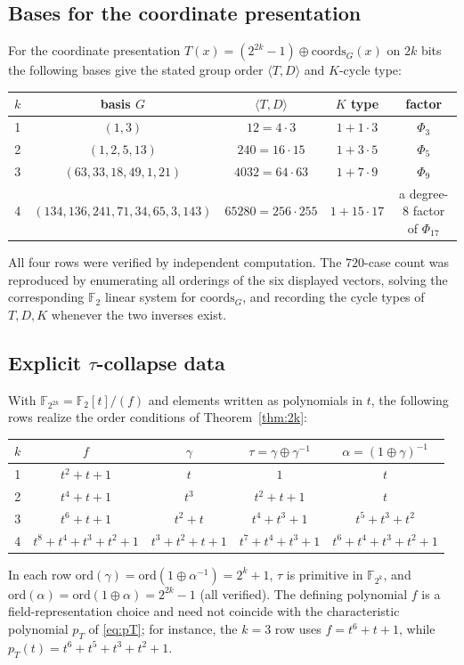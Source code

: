 \documentclass[11pt]{article}
\begin{document}
\subsection*{Bases for the coordinate presentation}
For the coordinate presentation $T(x)=(2^{2k}-1)\oplus\mathrm{coords}_G(x)$ on
$2k$ bits the following bases give the stated group order $\langle T,D\rangle$ and
$K$-cycle type:
\begin{center}
\begin{tabular}{c|c|c|c|c}
$k$ & basis $G$ & $\langle T,D\rangle$ & $K$ type & factor \\
\hline
1 & $(1,3)$ & $12=4\cdot3$ & $1+1\cdot3$ & $\Phi_3$ \\
2 & $(1,2,5,13)$ & $240=16\cdot15$ & $1+3\cdot5$ & $\Phi_5$ \\
3 & $(63,33,18,49,1,21)$ & $4032=64\cdot63$ & $1+7\cdot9$ & $\Phi_9$ \\
4 & $(134,136,241,71,34,65,3,143)$ & $65280=256\cdot255$ & $1+15\cdot17$ & a degree-$8$ factor of $\Phi_{17}$ \\
\end{tabular}
\end{center}
All four rows were verified by independent computation. The $720$-case count
was reproduced by enumerating all orderings of the six displayed vectors, solving
the corresponding $\mathbb{F}_2$ linear system for $\mathrm{coords}_G$, and
recording the cycle types of $T,D,K$ whenever the two inverses exist.

\subsection*{Explicit $\tau$-collapse data}
With $\mathbb{F}_{2^{2k}}=\mathbb{F}_2[t]/(f)$ and elements written as polynomials in $t$,
the following rows realize the order conditions of Theorem~\ref{thm:2k}:
\begin{center}
\begin{tabular}{c|c|c|c|c}
$k$ & $f$ & $\gamma$ & $\tau=\gamma\oplus\gamma^{-1}$ & $\alpha=(1\oplus\gamma)^{-1}$ \\
\hline
1 & $t^2+t+1$ & $t$ & $1$ & $t$ \\
2 & $t^4+t+1$ & $t^3$ & $t^2+t+1$ & $t$ \\
3 & $t^6+t+1$ & $t^2+t$ & $t^4+t^3+1$ & $t^5+t^3+t^2$ \\
4 & $t^8+t^4+t^3+t^2+1$ & $t^3+t^2+t+1$ & $t^7+t^4+t^3+1$ & $t^6+t^4+t^3+t^2+1$ \\
\end{tabular}
\end{center}
In each row $\mathrm{ord}(\gamma)=\mathrm{ord}(1\oplus\alpha^{-1})=2^k+1$, $\tau$ is
primitive in $\mathbb{F}_{2^k}$, and
$\mathrm{ord}(\alpha)=\mathrm{ord}(1\oplus\alpha)=2^{2k}-1$ (all verified). The defining polynomial $f$ is a field-representation choice and need not coincide with the characteristic polynomial $p_T$ of \eqref{eq:pT}; for instance, the $k=3$ row uses $f=t^6+t+1$, while $p_T(t)=t^6+t^5+t^3+t^2+1$.
\end{document}

